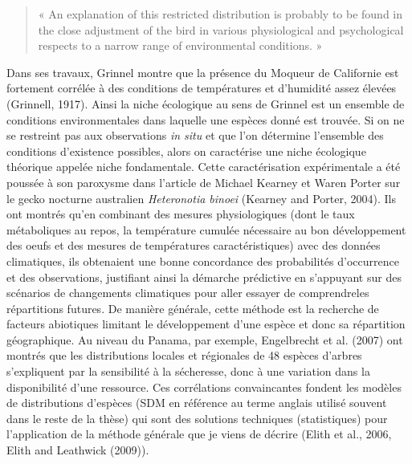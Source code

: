 \begin{quote}
« An explanation of this restricted distribution is probably to be found
in the close adjustment of the bird in various physiological and
psychological respects to a narrow range of environmental conditions. »
\end{quote}

Dans ses travaux, Grinnel montre que la présence du Moqueur de
Californie est fortement corrélée à des conditions de températures et
d'humidité assez élevées (Grinnell, 1917). Ainsi la niche écologique au
sens de Grinnel est un ensemble de conditions environmentales dans
laquelle une espèces donné est trouvée. Si on ne se restreint pas aux
observations \emph{in situ} et que l'on détermine l'ensemble des
conditions d'existence possibles, alors on caractérise une niche
écologique théorique appelée niche fondamentale. Cette caractérisation
expérimentale a été poussée à son paroxysme dans l'article de Michael
Kearney et Waren Porter sur le gecko nocturne australien
\emph{Heteronotia binoei} (Kearney and Porter, 2004). Ils ont montrés
qu'en combinant des mesures physiologiques (dont le taux métaboliques au
repos, la température cumulée nécessaire au bon développement des oeufs
et des mesures de températures caractéristiques) avec des données
climatiques, ils obtenaient une bonne concordance des probabilités
d'occurrence et des observations, justifiant ainsi la démarche
prédictive en s'appuyant sur des scénarios de changements climatiques
pour aller essayer de comprendreles répartitions futures. De manière
générale, cette méthode est la recherche de facteurs abiotiques limitant
le développement d'une espèce et donc sa répartition géographique. Au
niveau du Panama, par exemple, Engelbrecht et al. (2007) ont montrés que
les distributions locales et régionales de 48 espèces d'arbres
s'expliquent par la sensibilité à la sécheresse, donc à une variation
dans la disponibilité d'une ressource. Ces corrélations convaincantes
fondent les modèles de distributions d'espèces (SDM en référence au
terme anglais utilisé souvent dans le reste de la thèse) qui sont des
solutions techniques (statistiques) pour l'application de la méthode
générale que je viens de décrire (Elith et al., 2006, Elith and
Leathwick (2009)).

